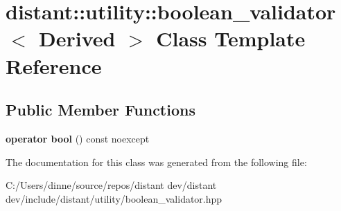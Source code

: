 \hypertarget{classdistant_1_1utility_1_1boolean__validator}{}\section{distant\+:\+:utility\+:\+:boolean\+\_\+validator$<$ Derived $>$ Class Template Reference}
\label{classdistant_1_1utility_1_1boolean__validator}
\subsection*{Public Member Functions}
\begin{DoxyCompactItemize}
\item 
\mbox{\label{classdistant_1_1utility_1_1boolean__validator_a4b549ffb8fddc68ec7370bb3df93f7d3}} 
{\bfseries operator bool} () const noexcept
\end{DoxyCompactItemize}


The documentation for this class was generated from the following file\+:\begin{DoxyCompactItemize}
\item 
C\+:/\+Users/dinne/source/repos/distant dev/distant dev/include/distant/utility/boolean\+\_\+validator.\+hpp\end{DoxyCompactItemize}
